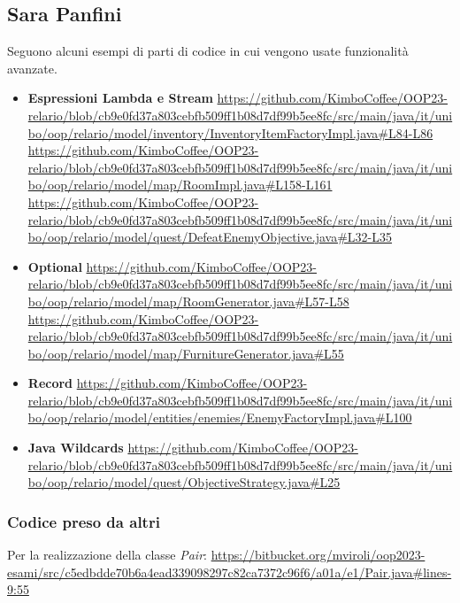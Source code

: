 \documentclass[a4paper,12pt]{report}
\begin{document}
\subsection{Sara Panfini}
Seguono alcuni esempi di parti di codice in cui vengono usate funzionalità avanzate.
\begin{itemize}
	\item \textbf{Espressioni Lambda e Stream}
	\newline\url{https://github.com/KimboCoffee/OOP23-relario/blob/cb9e0fd37a803cebfb509ff1b08d7df99b5ee8fc/src/main/java/it/unibo/oop/relario/model/inventory/InventoryItemFactoryImpl.java#L84-L86}
	\newline\url{https://github.com/KimboCoffee/OOP23-relario/blob/cb9e0fd37a803cebfb509ff1b08d7df99b5ee8fc/src/main/java/it/unibo/oop/relario/model/map/RoomImpl.java#L158-L161}
	\newline\url{https://github.com/KimboCoffee/OOP23-relario/blob/cb9e0fd37a803cebfb509ff1b08d7df99b5ee8fc/src/main/java/it/unibo/oop/relario/model/quest/DefeatEnemyObjective.java#L32-L35}
	
	\item \textbf{Optional}
	\newline\url{https://github.com/KimboCoffee/OOP23-relario/blob/cb9e0fd37a803cebfb509ff1b08d7df99b5ee8fc/src/main/java/it/unibo/oop/relario/model/map/RoomGenerator.java#L57-L58}
	\newline\url{https://github.com/KimboCoffee/OOP23-relario/blob/cb9e0fd37a803cebfb509ff1b08d7df99b5ee8fc/src/main/java/it/unibo/oop/relario/model/map/FurnitureGenerator.java#L55}
	
	\item \textbf{Record}
	\newline\url{https://github.com/KimboCoffee/OOP23-relario/blob/cb9e0fd37a803cebfb509ff1b08d7df99b5ee8fc/src/main/java/it/unibo/oop/relario/model/entities/enemies/EnemyFactoryImpl.java#L100}
	
	\item \textbf{Java Wildcards}
	\newline\url{https://github.com/KimboCoffee/OOP23-relario/blob/cb9e0fd37a803cebfb509ff1b08d7df99b5ee8fc/src/main/java/it/unibo/oop/relario/model/quest/ObjectiveStrategy.java#L25}
\end{itemize}

\subsubsection{Codice preso da altri}
Per la realizzazione della classe \textit{Pair}: \url{https://bitbucket.org/mviroli/oop2023-esami/src/c5edbdde70b6a4ead339098297c82ca7372c96f6/a01a/e1/Pair.java#lines-9:55}
\end{document}
